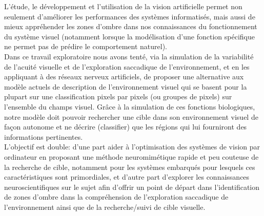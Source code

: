 L'étude, le développement et l'utilisation de la vision artificielle permet non seulement d'améliorer les performances des systèmes informatisés, mais aussi de mieux appréhender les zones d'ombre dans nos connaissances du fonctionnement du système visuel (notamment lorsque la modélisation d'une fonction spécifique ne permet pas de prédire le comportement naturel). \autocite{Werner2014} \\

Dans ce travail exploratoire nous avons tenté, via la simulation de la variabilité de l'acuité visuelle et de l'exploration saccadique de l'environnement, et en les appliquant à des réseaux nerveux artificiels, de proposer une alternative aux modèle actuels de description de l'environnement visuel qui se basent pour la plupart sur une classification pixels par pixels (ou groupes de pixels) sur l'ensemble du champs visuel. 
Grâce à la simulation de ces fonctions biologiques, notre modèle doit pouvoir rechercher une cible dans son environnement visuel de façon autonome et ne décrire (classifier) que les régions qui lui fourniront des informations pertinentes. \\
L'objectif est double: d'une part aider à l'optimisation des systèmes de vision par ordinateur en proposant une méthode neuromimétique rapide et peu couteuse de la recherche de cible, notamment pour les systèmes embarqués pour lesquels ces caractéristiques sont primordiales, et d'autre part d'explorer les connaissances neuroscientifiques sur le sujet afin d'offrir un point de départ dans l'identification de zones d'ombre dans la compréhension de l'exploration saccadique de l'environnement ainsi que de la recherche/suivi de cible visuelle.